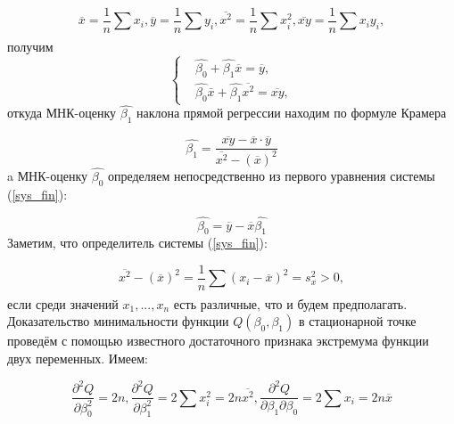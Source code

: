 \documentclass[../body.tex]{subfiles}
\begin{document}
	\begin{equation}
		\overline{x} = \frac{1}{n}\sum_{}{}{x_{i}}, \overline{y} = \frac{1}{n}\sum_{}{}{y_{i}}, \overline{x^{2}} = \frac{1}{n}\sum_{}{}{x_{i}^{2}}, \overline{xy} = \frac{1}{n}\sum_{}{}{x_{i}y_{i}}, 
	\end{equation}
	получим
	\begin{equation}
		\begin{cases}
			& \widehat{\beta_{0}} + \widehat{\beta_{1}}\overline{x} = 
			\overline{y},\\ 
			
			& \widehat{\beta_{0}}\bar{x} + \widehat{\beta_{1}}\overline{x^{2}} = \overline{xy},
		\end{cases}
		\label{sys_fin}
	\end{equation}
	откуда МНК-оценку $\widehat{\beta_1}$ наклона прямой регрессии находим по формуле Крамера
	
	\begin{equation}
		\widehat{\beta_{1}} = \frac{\overline{xy} - \overline{x} \cdot \overline{y}}{\overline{x^{2}} - (\overline{x})^{2}}
		\label{beta_1_new}
	\end{equation}
	a МНК-оценку $\widehat{\beta_0}$  определяем непосредственно из первого уравнения системы (\ref{sys_fin}):
	
	\begin{equation}
		\widehat{\beta_{0}} = \overline{y} - \overline{x}\widehat{\beta_{1}}
		\label{beta_0_new}
	\end{equation}
	Заметим, что определитель системы (\ref{sys_fin}):
	
	\begin{equation}
		\overline{x^{2}} - (\overline{x})^{2} = \frac{1}{n}\sum_{}{}{(x_{i} - \overline{x})^{2}} = s_{x}^{2} > 0, 
	\end{equation}
	если среди значений $x_{1},...,x_{n}$ есть различные, что и будем предполагать.
	\newline
	Доказательство минимальности функции $Q(\beta_{0}, \beta_{1})$ в стационарной точке проведём с помощью известного достаточного признака экстремума функции двух переменных. Имеем:
	
	\begin{equation}
		\frac{\partial ^{2} Q}{\partial \beta_{0}^{2}} = 2n, 
		\frac{\partial ^{2} Q}{\partial \beta_{1}^{2}} = 2\sum_{}{}{x_{i}^{2}} = 2n\overline{x^{2}}, 
		\frac{\partial ^{2} Q}{\partial \beta_{1} \partial \beta_{0}} = 2\sum_{}{}{x_{i}} = 2n\overline{x}
		\label{frac_eq}
	\end{equation}
	
\end{document}
